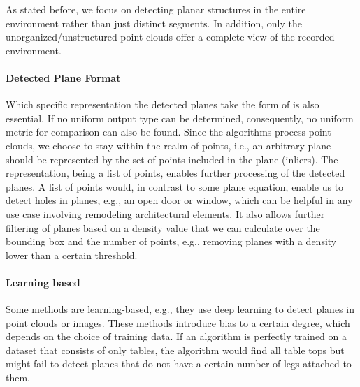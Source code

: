 \documentclass[main.tex]{subfiles}
\begin{document}
As stated before, we focus on detecting planar structures in the entire environment rather than just distinct segments.
In addition, only the unorganized/unstructured point clouds offer a complete view of the recorded environment.


\paragraph{Detected Plane Format} \label{subsec:planeformat}
Which specific representation the detected planes take the form of is also essential.
If no uniform output type can be determined, consequently, no uniform metric for comparison can also be found.
Since the algorithms process point clouds, we choose to stay within the realm of points, i.e., an arbitrary plane should be
represented by the set of points included in the plane (inliers).
The representation, being a list of points, enables further processing of the detected planes.
A list of points would, in contrast to some plane equation, enable us to detect holes in planes, e.g.,
an open door or window, which can be helpful in any use case involving remodeling architectural elements.
It also allows further filtering of planes based on a density value that we can calculate over the bounding
box and the number of points, e.g., removing planes with a density lower than a certain threshold.


\paragraph{Learning based}\label{subsec_learning_based}
Some methods are learning-based, e.g., they use deep learning to detect planes in point clouds or images.
These methods introduce bias to a certain degree, which depends on the choice of training data. If an algorithm is perfectly trained on
a dataset that consists of only tables, the algorithm would find all table tops but might fail to detect planes that do not have a certain number
of legs attached to them.

\end{document}

